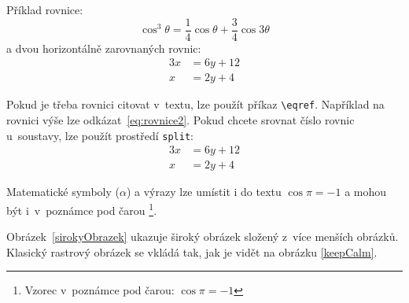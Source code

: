 
\noindent Příklad rovnice:
\begin{equation}
	\cos^3 \theta =\frac{1}{4}\cos\theta+\frac{3}{4}\cos 3\theta
	\label{eq:rovnice2}
\end{equation}
a dvou horizontálně zarovnaných rovnic: %
\begin{align} 
    \label{eq:soustava}
	3x &= 6y + 12 \\
	x &= 2y + 4 
\end{align}

Pokud je třeba rovnici citovat v~textu, lze použít příkaz \verb|\eqref|. Například na rovnici výše lze odkázat~\eqref{eq:rovnice2}. Pokud chcete srovnat číslo rovnic u~soustavy, lze použít prostředí \texttt{split}:
\begin{equation} \label{eq:soustavaSrovnana}
\begin{split}
	3x &= 6y + 12 \\
	x &= 2y + 4
\end{split}
\end{equation}

Matematické symboly ($\alpha$) a výrazy lze umístit i do textu $\cos\pi=-1$ a mohou být i~v~poznámce pod čarou%
\footnote{Vzorec v~poznámce pod čarou: $\cos\pi=-1$}.

Obrázek~\ref{sirokyObrazek} ukazuje široký obrázek složený z~více menších obrázků. Klasický rastrový obrázek se vkládá tak, jak je vidět na obrázku \ref{keepCalm}.

